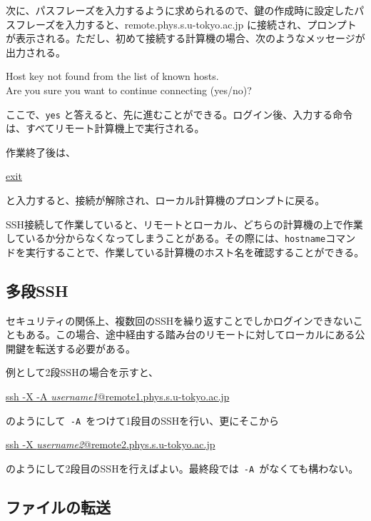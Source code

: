 次に、パスフレーズを入力するように求められるので、鍵の作成時に設定したパスフレーズを入力すると、remote.phys.s.u-tokyo.ac.jp に接続され、プロンプトが表示される。ただし、初めて接続する計算機の場合、次のようなメッセージが出力される。
\begin{commandline2}
    Host key not found from the list of known hosts.\\
    Are you sure you want to continue connecting (yes/no)?
\end{commandline2} \noindent
ここで、\texttt{yes} と答えると、先に進むことができる。ログイン後、入力する命令は、すべてリモート計算機上で実行される。

作業終了後は、
\begin{commandline2}
    \prompt \underline{exit}
\end{commandline2} \noindent
と入力すると、接続が解除され、ローカル計算機のプロンプトに戻る。

SSH接続して作業していると、リモートとローカル、どちらの計算機の上で作業しているか分からなくなってしまうことがある。その際には、\texttt{hostname}コマンドを実行することで、作業している計算機のホスト名を確認することができる。

\subsection{多段SSH}

セキュリティの関係上、複数回のSSHを繰り返すことでしかログインできないこともある。この場合、途中経由する踏み台のリモートに対してローカルにある公開鍵を転送する必要がある。

例として2段SSHの場合を示すと、
\begin{commandline2}
    \prompt \underline{ssh -X -A \textit{username1}@remote1.phys.s.u-tokyo.ac.jp}
\end{commandline2} \noindent
のようにして\texttt{ -A }をつけて1段目のSSHを行い、更にそこから
\begin{commandline2}
    \prompt \underline{ssh -X \textit{username2}@remote2.phys.s.u-tokyo.ac.jp}
\end{commandline2} \noindent
のようにして2段目のSSHを行えばよい。最終段では\texttt{ -A }がなくても構わない。

\subsection{ファイルの転送}

